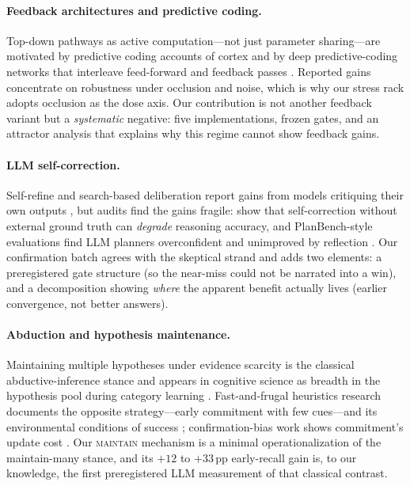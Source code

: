 \documentclass[10pt]{article}
\newcommand{\Mmaint}{\textsc{maintain}}
\begin{document}
\paragraph{Feedback architectures and predictive coding.}
Top-down pathways as active computation---not just parameter sharing---are
motivated by predictive coding accounts of cortex
\citep{rao1999predictive,friston2010free} and by deep predictive-coding
networks that interleave feed-forward and feedback passes
\citep{lotter2017deep}. Reported gains concentrate on robustness under
occlusion and noise, which is why our stress rack adopts occlusion as the
dose axis. Our contribution is not another feedback variant but a
\emph{systematic} negative: five implementations, frozen gates, and an
attractor analysis that explains why this regime cannot show feedback gains.

\paragraph{LLM self-correction.}
Self-refine and search-based deliberation report gains from models critiquing
their own outputs \citep{madaan2023selfrefine,yao2023tree}, but audits find
the gains fragile: \citet{huang2024large} show that self-correction without
external ground truth can \emph{degrade} reasoning accuracy, and
PlanBench-style evaluations find LLM planners overconfident and
unimproved by reflection \citep{valmeekam2023planbench}. Our confirmation
batch agrees with the skeptical strand and adds two elements: a
preregistered gate structure (so the near-miss could not be narrated into
a win), and a decomposition showing \emph{where} the apparent benefit
actually lives (earlier convergence, not better answers).

\paragraph{Abduction and hypothesis maintenance.}
Maintaining multiple hypotheses under evidence scarcity is the classical
abductive-inference stance \citep{peirce1878abduction,josephson1996abductive}
and appears in cognitive science as breadth in the hypothesis pool during
category learning \citep{tenenbaum2011grow}. Fast-and-frugal heuristics
research documents the opposite strategy---early commitment with few
cues---and its environmental conditions of success
\citep{gigerenzer1999fast}; confirmation-bias work shows commitment's
update cost \citep{nickerson1998confirmation}. Our \Mmaint{} mechanism is
a minimal operationalization of the maintain-many stance, and its
$+12$ to $+33$\,pp early-recall gain is, to our knowledge, the first
preregistered LLM measurement of that classical contrast.
\end{document}
